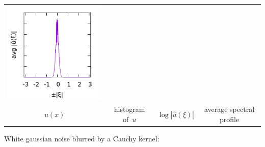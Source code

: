 \begin{tabular}{cccc}
	\includegraphics{B256_p.png} \\
	$u(x)$ &
	histogram of~$u$ &
	$\log|\hat u(\xi)|$ &
	average spectral profile
\end{tabular}



White gaussian noise blurred by a Cauchy kernel:

